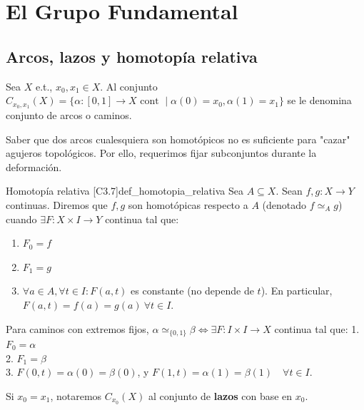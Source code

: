 \section{El Grupo Fundamental}

\subsection{Arcos, lazos y homotopía relativa}

Sea $X$ e.t., $x_0, x_1 \in X$. Al conjunto $C_{x_0, x_1}(X) = \{ \alpha \colon [0,1] \to X \text{ cont } \mid \alpha(0) = x_0, \alpha(1) = x_1 \}$ se le denomina conjunto de arcos o caminos. 

Saber que dos arcos cualesquiera son homotópicos no es suficiente para "cazar" agujeros topológicos. Por ello, requerimos fijar subconjuntos durante la deformación.

\begin{definicion}{Homotopía relativa [C3.7]}{def_homotopia_relativa}
Sea $A \subseteq X$. Sean $f, g \colon X \to Y$ continuas. Diremos que $f, g$ son homotópicas respecto a $A$ (denotado $f \simeq_A g$) cuando $\exists F \colon X \times I \to Y$ continua tal que:
\begin{enumerate}
    \item $F_0 = f$
    \item $F_1 = g$
    \item $\forall a \in A, \forall t \in I \colon F(a,t)$ es constante (no depende de $t$). En particular, $F(a,t) = f(a) = g(a) \ \forall t \in I$.
\end{enumerate}
\end{definicion}

Para caminos con extremos fijos, $\alpha \simeq_{\{0,1\}} \beta \iff \exists F \colon I \times I \to X$ continua tal que:
1. $F_0 = \alpha$ \\
2. $F_1 = \beta$ \\
3. $F(0,t) = \alpha(0) = \beta(0)$, y $F(1,t) = \alpha(1) = \beta(1) \quad \forall t \in I$.

Si $x_0 = x_1$, notaremos $C_{x_0}(X)$ al conjunto de \textbf{lazos} con base en $x_0$.

